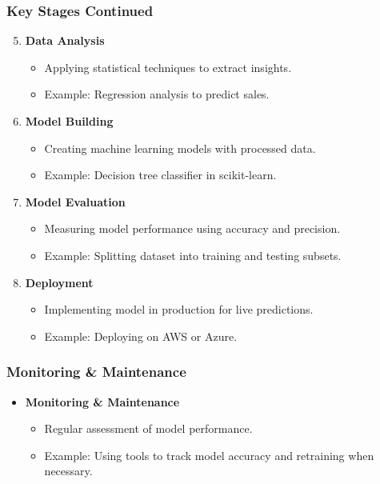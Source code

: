 \documentclass[aspectratio=169]{beamer}
\begin{document}
\begin{frame}[fragile]
    \frametitle{Key Stages Continued}
    \begin{enumerate}
        \setcounter{enumi}{4}
        \item \textbf{Data Analysis}
            \begin{itemize}
                \item Applying statistical techniques to extract insights.
                \item Example: Regression analysis to predict sales.
            \end{itemize}
        \item \textbf{Model Building}
            \begin{itemize}
                \item Creating machine learning models with processed data.
                \item Example: Decision tree classifier in scikit-learn.
            \end{itemize}
        \item \textbf{Model Evaluation}
            \begin{itemize}
                \item Measuring model performance using accuracy and precision.
                \item Example: Splitting dataset into training and testing subsets.
            \end{itemize}
        \item \textbf{Deployment}
            \begin{itemize}
                \item Implementing model in production for live predictions.
                \item Example: Deploying on AWS or Azure.
            \end{itemize}
    \end{enumerate}
\end{frame}

\begin{frame}[fragile]
    \frametitle{Monitoring & Maintenance}
    \begin{itemize}
        \item \textbf{Monitoring & Maintenance}
            \begin{itemize}
                \item Regular assessment of model performance.
                \item Example: Using tools to track model accuracy and retraining when necessary.
            \end{itemize}
    \end{itemize}
\end{frame}
\end{document}
